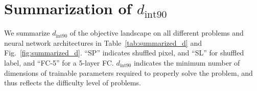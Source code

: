 \documentclass{article} %
\newcommand{\dintn}{d_{\mathrm{int90}}}
\begin{document}
\section{Summarization of $\dintn$}
We summarize $\dintn$ of the objective landscape on all different problems and neural network architectures in Table~\ref{tab:summarized_d} and Fig.~\ref{fig:summarized_d}.  ``SP'' indicates shuffled pixel, and ``SL'' for shuffled label, and ``FC-5'' for a 5-layer FC. %
$\dintn$ indicates the minimum number of dimensions of trainable parameters required to properly solve the problem, and thus reflects the difficulty level of problems. %
%
\end{document}
